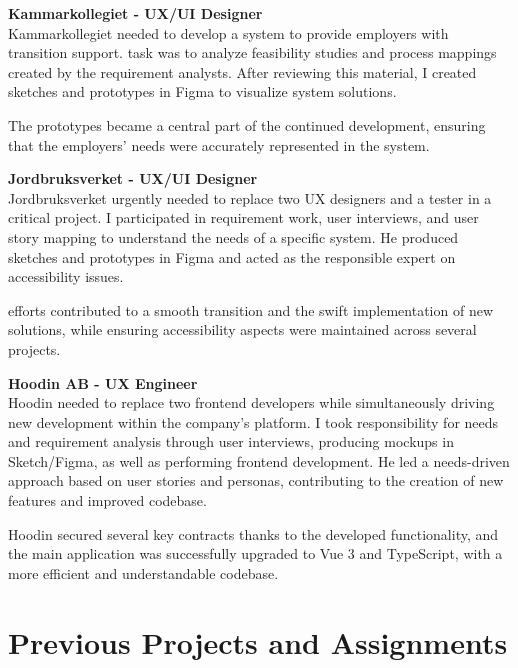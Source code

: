 \documentclass[a4paper,10pt]{article}
\begin{document}
\textbf{Kammarkollegiet - UX/UI Designer}\\
Kammarkollegiet needed to develop a system to provide employers with transition support. task was to analyze feasibility studies and process mappings created by the requirement analysts. After reviewing this material, I created sketches and prototypes in Figma to visualize system solutions.

The prototypes became a central part of the continued development, ensuring that the employers' needs were accurately represented in the system.

\vspace{0.3cm}

\textbf{Jordbruksverket - UX/UI Designer}\\
Jordbruksverket urgently needed to replace two UX designers and a tester in a critical project. I participated in requirement work, user interviews, and user story mapping to understand the needs of a specific system. He produced sketches and prototypes in Figma and acted as the responsible expert on accessibility issues.

efforts contributed to a smooth transition and the swift implementation of new solutions, while ensuring accessibility aspects were maintained across several projects.

\vspace{0.3cm}

\textbf{Hoodin AB - UX Engineer}\\
Hoodin needed to replace two frontend developers while simultaneously driving new development within the company's platform. I took responsibility for needs and requirement analysis through user interviews, producing mockups in Sketch/Figma, as well as performing frontend development. He led a needs-driven approach based on user stories and personas, contributing to the creation of new features and improved codebase.

\vspace{0.3cm}

Hoodin secured several key contracts thanks to the developed functionality, and the main application was successfully upgraded to Vue 3 and TypeScript, with a more efficient and understandable codebase.

\vspace{0.5cm}

\section*{Previous Projects and Assignments}
\end{document}
